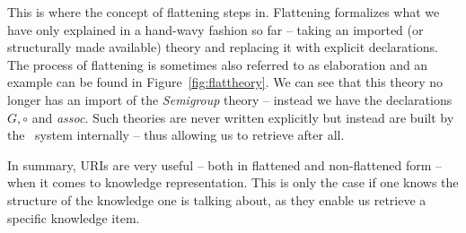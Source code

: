 

This is where the concept of flattening steps in.
Flattening formalizes what we have only explained in a hand-wavy fashion so far -- taking an imported (or structurally made available) theory and replacing it with explicit declarations.
The process of flattening is sometimes also referred to as elaboration and an example can be found in Figure~\ref{fig:flattheory}.
We can see that this theory no longer has an import of the \textit{Semigroup} theory -- instead we have the declarations $G, \circ$ and \textit{assoc}.
Such theories are never written explicitly but instead are built by the \mmt\ system internally -- thus allowing us to retrieve  after all.

In summary, URIs are very useful -- both in flattened and non-flattened form -- when it comes to knowledge representation.
This is only the case if one knows the structure of the knowledge one is talking about, as they enable us retrieve a specific knowledge item.
